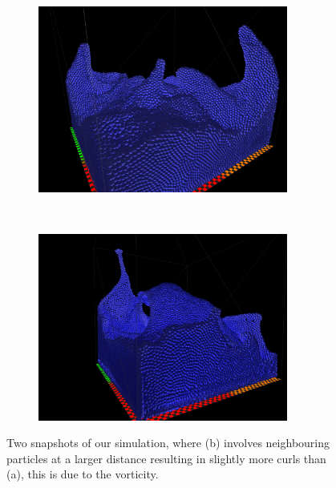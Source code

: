 \begin{figure}[H]
\centering
\begin{subfigure}{.9\textwidth}
  \centering
  \includegraphics[width=0.9\textwidth]{img/55296_edit.png}
  \caption{}
\end{subfigure}%
\\
\begin{subfigure}{.9\textwidth}
  \centering
  \includegraphics[width=0.9\textwidth]{img/3Nieghbours_55size.png}
  \caption{}
\end{subfigure}%

\caption{Two snapshots of our simulation, where (b) involves neighbouring particles at a larger distance resulting in slightly more curls than (a), this is due to the vorticity.}
\label{fig:result}
\end{figure}

\newpage

